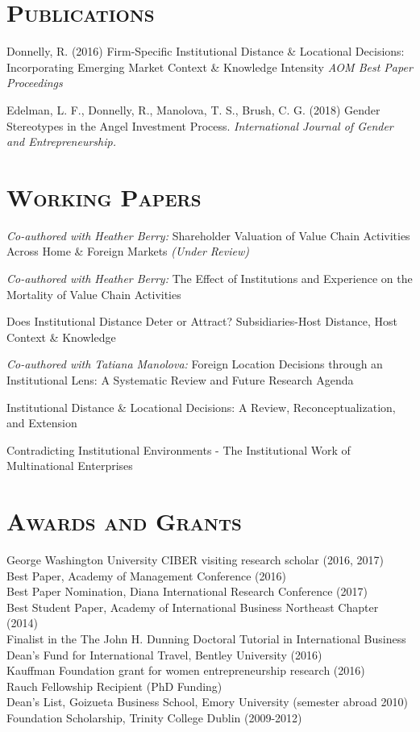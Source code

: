 \documentclass[margin, 12pt]{res}
\begin{document}
\begin{resume}
\section{\normalfont\textsc{Publications}}
Donnelly, R. (2016) Firm-Specific Institutional Distance \& Locational Decisions: Incorporating Emerging Market Context \& Knowledge Intensity  \textit{AOM  Best Paper Proceedings}

Edelman, L. F., Donnelly, R., Manolova, T. S., Brush, C. G. (2018) Gender Stereotypes in the Angel Investment Process. \textit{International Journal of Gender and Entrepreneurship.} 



\section{\normalfont\textsc{Working Papers}}


\textit{Co-authored with Heather Berry:} Shareholder Valuation of Value Chain Activities Across Home \& Foreign Markets \textit{(Under Review)}

\textit{Co-authored with Heather Berry:}  The Effect of Institutions and Experience on the Mortality of Value Chain Activities


Does Institutional Distance Deter or Attract? Subsidiaries-Host Distance, Host Context \& Knowledge	


\textit{Co-authored with Tatiana Manolova:} Foreign Location Decisions through an Institutional Lens: A Systematic Review and Future Research Agenda  


Institutional Distance \& Locational Decisions: A Review, Reconceptualization, and Extension 

Contradicting Institutional Environments - The Institutional Work of Multinational Enterprises 

\bigskip
\bigskip

\section{\normalfont\textsc{Awards and Grants}}
George Washington University CIBER visiting research scholar (2016, 2017) \\[0.2em]
Best Paper, Academy of Management Conference (2016)\\[0.2em]
Best Paper Nomination, Diana International Research Conference (2017)\\[0.2em]
Best Student Paper, Academy of International Business Northeast Chapter (2014)\\[0.2em]
Finalist in the The John H. Dunning Doctoral Tutorial in International Business \\ [0.2em]
Dean's Fund for International Travel, Bentley University (2016) \\
[0.2em]
Kauffman Foundation grant for women entrepreneurship research (2016) \\
[0.2em]
Rauch Fellowship Recipient (PhD Funding) \\
[0.2em]
Dean's List, Goizueta Business School, Emory University (semester abroad 2010)
Foundation Scholarship, Trinity College Dublin (2009-2012) 






\end{resume}
\end{document}
